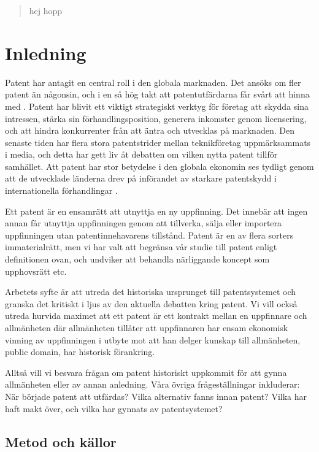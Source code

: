 
\begin{abstract}
	hej hopp
\end{abstract}	
	
	
\section{Inledning}

Patent har antagit en central roll i den globala marknaden.
Det ansöks om fler patent än någonsin, och i en så hög takt att patentutfärdarna
får svårt att hinna med \cite{uspto_number}.
Patent har blivit ett viktigt strategiskt verktyg för företag att skydda sina
intressen, stärka sin förhandlingsposition, generera inkomster genom
licensering, och att hindra konkurrenter från att äntra och utvecklas på
marknaden. 
Den senaste tiden har flera stora patentstrider mellan teknikföretag
uppmärksammats i media, och detta har gett liv åt debatten om vilken nytta
patent tillför samhället.
Att patent har stor betydelse i den globala ekonomin ses tydligt genom att
de utvecklade länderna drev på införandet av starkare patentskydd i
internationella förhandlingar \cite{}. 

Ett patent är en ensamrätt att utnyttja en ny uppfinning. Det innebär att ingen
annan får utnyttja uppfinningen genom att tillverka, sälja eller importera 
uppfinningen utan patentinnehavarens tillstånd. Patent är en av flera sorters
immaterialrätt, men vi har valt att begränsa vår studie till patent enligt
definitionen ovan, och undviker att behandla närliggande koncept som upphovsrätt
etc.

Arbetets syfte är att utreda det historiska ursprunget till patentsystemet och
granska det kritiskt i ljus av den aktuella debatten kring patent.
Vi vill också utreda hurvida maximet att ett patent är ett kontrakt mellan en
uppfinnare och allmänheten där allmänheten tillåter att uppfinnaren har ensam
ekonomisk vinning av uppfinningen i utbyte mot att han delger kunskap till
allmänheten, public domain, har historisk förankring.

Alltså vill vi besvara frågan om patent historiskt uppkommit för att gynna
allmänheten eller av annan anledning. Våra övriga frågeställningar inkluderar:
När började patent att utfärdas? Vilka alternativ fanns innan patent?
Vilka har haft makt över, och vilka har gynnats av patentsystemet?


\subsection{Metod och källor}

